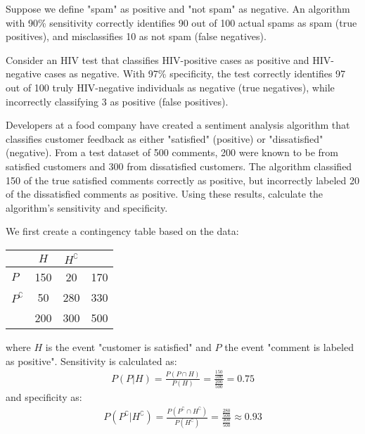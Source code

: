 \begin{exmp}
	Suppose we define "spam" as positive and "not spam" as negative.
	An algorithm with 90\% sensitivity correctly identifies 90 out of 100 actual spams as spam (true positives), and misclassifies 10 as not spam (false negatives).
\end{exmp}

\begin{exmp}
	Consider an HIV test that classifies HIV-positive cases as positive and HIV-negative cases as negative.
	With 97\% specificity, the test correctly identifies 97 out of 100 truly HIV-negative individuals as negative (true negatives),
	while incorrectly classifying 3 as positive (false positives).
\end{exmp}

\begin{exmp}
	Developers at a food company have created a sentiment analysis algorithm that classifies customer feedback as either "satisfied" (positive) or "dissatisfied" (negative).
	From a test dataset of 500 comments, 200 were known to be from satisfied customers and 300 from dissatisfied customers.
	The algorithm classified 150 of the true satisfied comments correctly as positive,
	but incorrectly labeled 20 of the dissatisfied comments as positive.
	Using these results, calculate the algorithm's sensitivity and specificity.
\end{exmp}
\begin{solution}
	We first create a contingency table based on the data:
	\begin{center}
	\begin{tabular}{l|cc|c}
						& \( H \) & \( H^\complement \) &  \\ \hline
	\( P \)                & 150 & 20 & 170\\ 
	\( P^\complement \)    & 50 & 280 & 330 \\ \hline
						& 200 & 300 & 500
	\end{tabular}
	\end{center}
	where \( H \) is the event "customer is satisfied" and \( P \) the event "comment is labeled as positive".
	Sensitivity is calculated as:
	\begin{gather*}
		P(P | H) = \frac{P(P \cap H)}{P(H)} = \frac{\frac{150}{500}}{\frac{200}{500}} = 0.75
	\end{gather*}
	and specificity as:
	\begin{gather*}
		P(P^\complement | H^\complement) = \frac{P(P^\complement \cap H^\complement)}{P(H^\complement)} = \frac{\frac{280}{500}}{\frac{300}{500}} \approx 0.93
	\end{gather*}
\end{solution}

